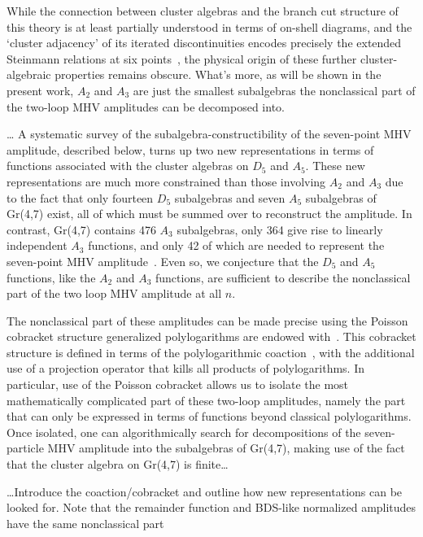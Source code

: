 \documentclass[11pt]{article}
\begin{document}
While the connection between cluster algebras and the branch cut structure of this theory is at least partially understood in terms of on-shell diagrams, and the `cluster adjacency' of its iterated discontinuities encodes precisely the extended Steinmann relations at six points~\cite{Caron-Huot:2018dsv,cosmic_galois_paper}, the physical origin of these further cluster-algebraic properties remains obscure. What's more, as will be shown in the present work, $A_2$ and $A_3$ are just the smallest subalgebras the nonclassical part of the two-loop MHV amplitudes can be decomposed into. 

\dots
A systematic survey of the subalgebra-constructibility of the seven-point MHV amplitude, described below, turns up two new representations in terms of functions associated with the cluster algebras on $D_5$ and $A_5$. These new representations are much more constrained than those involving $A_2$ and $A_3$ due to the fact that only fourteen $D_5$ subalgebras and seven $A_5$ subalgebras of Gr(4,7) exist, all of which must be summed over to reconstruct the amplitude. In contrast, Gr(4,7) contains 476 $A_3$ subalgebras, only 364 give rise to linearly independent $A_3$ functions, and only 42 of which are needed to represent the seven-point MHV amplitude~\cite{Golden:2014xqa}.  Even so, we conjecture that the $D_5$ and $A_5$ functions, like the $A_2$ and $A_3$ functions, are sufficient to describe the nonclassical part of the two loop MHV amplitude at all $n$.

The nonclassical part of these amplitudes can be made precise using the Poisson cobracket structure generalized polylogarithms are endowed with~\cite{}. This cobracket structure is defined in terms of the polylogarithmic coaction~\cite{}, with the additional use of a projection operator that kills all products of polylogarithms. In particular, use of the Poisson cobracket allows us to isolate the most mathematically complicated part of these two-loop amplitudes, namely the part that can only be expressed in terms of functions beyond classical polylogarithms. Once isolated, one can algorithmically search for decompositions of the seven-particle MHV amplitude into the subalgebras of Gr(4,7), making use of the fact that the cluster algebra on Gr(4,7) is finite\dots

\dots Introduce the coaction/cobracket and outline how new representations can be looked for. Note that the remainder function and BDS-like normalized amplitudes have the same nonclassical part
\end{document}
